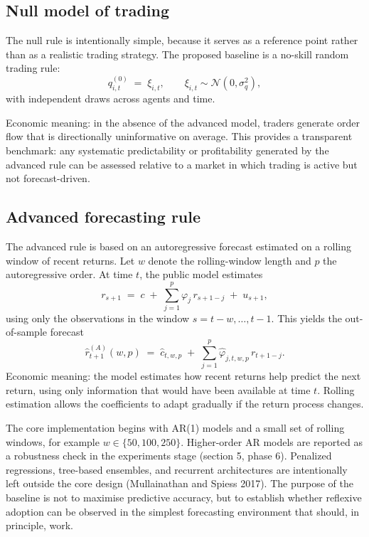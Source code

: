 \documentclass[11pt]{article}
\begin{document}
\subsection{Null model of trading}

The null rule is intentionally simple, because it serves as a reference point rather than as a realistic trading strategy. The proposed baseline is a no-skill random trading rule:
\begin{equation}
  q_{i,t}^{(0)} \;=\; \xi_{i,t}, \qquad \xi_{i,t} \sim \mathcal{N}(0, \sigma_{q}^{2}),
\end{equation}
with independent draws across agents and time.

Economic meaning: in the absence of the advanced model, traders generate order flow that is directionally uninformative on average. This provides a transparent benchmark: any systematic predictability or profitability generated by the advanced rule can be assessed relative to a market in which trading is active but not forecast-driven.

\subsection{Advanced forecasting rule}

The advanced rule is based on an autoregressive forecast estimated on a rolling window of recent returns. Let $w$ denote the rolling-window length and $p$ the autoregressive order. At time $t$, the public model estimates
\begin{equation}
  r_{s+1} \;=\; c \;+\; \sum_{j=1}^{p} \varphi_{j}\, r_{s+1-j} \;+\; u_{s+1},
\end{equation}
using only the observations in the window $s = t - w, \ldots, t - 1$. This yields the out-of-sample forecast
\begin{equation}
  \hat{r}_{t+1}^{(A)}(w, p) \;=\; \hat{c}_{t, w, p} \;+\; \sum_{j=1}^{p} \hat{\varphi}_{j, t, w, p}\, r_{t+1-j}.
\end{equation}
Economic meaning: the model estimates how recent returns help predict the next return, using only information that would have been available at time $t$. Rolling estimation allows the coefficients to adapt gradually if the return process changes.

The core implementation begins with AR(1) models and a small set of rolling windows, for example $w \in \{50, 100, 250\}$. Higher-order AR models are reported as a robustness check in the experiments stage (section 5, phase 6). Penalized regressions, tree-based ensembles, and recurrent architectures are intentionally left outside the core design (Mullainathan and Spiess 2017). The purpose of the baseline is not to maximise predictive accuracy, but to establish whether reflexive adoption can be observed in the simplest forecasting environment that should, in principle, work.
\end{document}
